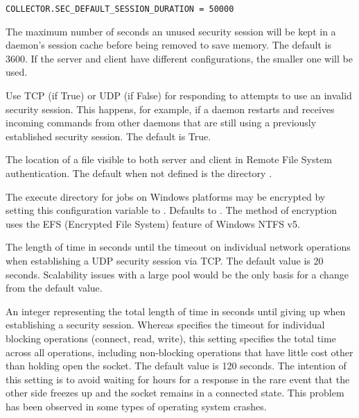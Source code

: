 \begin{description}
\begin{verbatim}
COLLECTOR.SEC_DEFAULT_SESSION_DURATION = 50000
\end{verbatim}

\label{param:SecDefaultSessionLease}
\item[\Macro{SEC\_<access-level>\_SESSION\_LEASE}]
  The maximum number of seconds an unused security session will be
  kept in a daemon's session cache before being removed to save memory.
  The default is 3600.  If the server and client have different
  configurations, the smaller one will be used.

\label{param:SecInvalidateSessionsViaTcp}
\item[\Macro{SEC\_INVALIDATE\_SESSIONS\_VIA\_TCP}]
  Use TCP (if True) or UDP (if False)
  for responding to attempts to use an invalid security session.  This happens,
  for example, if a daemon restarts and receives incoming commands from
  other daemons that are still using a previously established security session.
  The default is True.

\label{param:FSRemoteDir}
\item[\Macro{FS\_REMOTE\_DIR}]
  The location of a file visible to both server and client in
  Remote File System authentication.
  The default when not defined is the directory 
  .

\label{param:EncryptExecuteDirectory}
\item[\Macro{ENCRYPT\_EXECUTE\_DIRECTORY}]
  The execute directory for jobs on Windows platforms may be
  encrypted by setting this configuration variable to .
  Defaults to .
  The method of encryption uses the EFS (Encrypted File System)
  feature of Windows NTFS v5.

\label{param:SecTCPSessionTimeout}
\item[\Macro{SEC\_TCP\_SESSION\_TIMEOUT}]
  The length of time in seconds until the timeout
  on individual network operations when establishing a UDP security
  session via TCP.
  The default value is 20 seconds.
  Scalability issues with a large pool would be the only basis
  for a change from the default value.

\label{param:SecTCPSessionDeadline}
\item[\Macro{SEC\_TCP\_SESSION\_DEADLINE}]
  An integer representing the total length of time in seconds until giving up
  when establishing a security session.  Whereas
   specifies the timeout
  for individual blocking operations (connect, read, write), this
  setting specifies the total time across all operations, including
  non-blocking operations that have little cost other than holding
  open the socket.
  The default value is 120 seconds.
  The intention of this setting is to avoid waiting for hours
  for a response in the rare event that the other side
  freezes up and the socket remains in a connected state.
  This problem has been observed in some types of operating system
  crashes.


\end{description}
